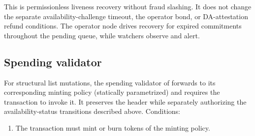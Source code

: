 \documentclass[../midgard.tex]{subfiles}
\begin{document}
This is permissionless liveness recovery without fraud slashing.
It does not change the separate availability-challenge timeout, the operator bond, or DA-attestation refund conditions.
The operator node drives recovery for expired commitments throughout the pending queue, while watchers observe and alert.

\subsection{Spending validator}
\label{h:state-queue-spending-validator}

For structural list mutations, the spending validator of  forwards to its corresponding minting policy (statically parametrized) and requires the transaction to invoke it.
It preserves the header while separately authorizing the availability-status transitions described above.
Conditions:
\begin{enumerate}
    \item The transaction must mint or burn tokens of the  minting policy.
\end{enumerate}
\end{document}
